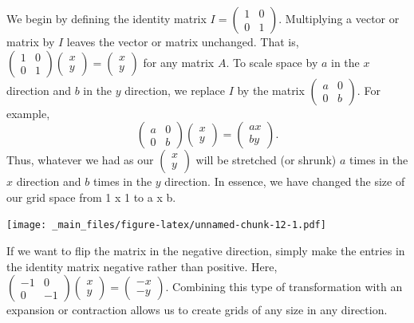 \documentclass[
]{book}
\theoremstyle{definition}
\theoremstyle{definition}
\theoremstyle{definition}
\theoremstyle{definition}
\theoremstyle{remark}
\begin{document}
We begin by defining the identity matrix \(I = \begin{pmatrix} 1 & 0 \\ 0 & 1 \end{pmatrix}\). Multiplying a vector or matrix by \(I\) leaves the vector or matrix unchanged. That is, \(\begin{pmatrix} 1 & 0 \\ 0 & 1 \end{pmatrix}\begin{pmatrix} x \\ y \end{pmatrix} = \begin{pmatrix} x \\ y \end{pmatrix}\) for any matrix \(A\). To scale space by \(a\) in the \(x\) direction and \(b\) in the \(y\) direction, we replace \(I\) by the matrix \(\begin{pmatrix} a & 0 \\ 0 & b \end{pmatrix}.\) For example, \[\begin{pmatrix} a & 0 \\ 0 & b \end{pmatrix}\begin{pmatrix} x \\ y \end{pmatrix} = \begin{pmatrix} ax \\ by \end{pmatrix}.\] Thus, whatever we had as our \(\begin{pmatrix} x \\ y \end{pmatrix}\) will be stretched (or shrunk) \(a\) times in the \(x\) direction and \(b\) times in the \(y\) direction. In essence, we have changed the size of our grid space from 1 x 1 to a x b.

\texttt{[image: \_main\_files/figure-latex/unnamed-chunk-12-1.pdf]}

If we want to flip the matrix in the negative direction, simply make the entries in the identity matrix negative rather than positive. Here, \(\begin{pmatrix} -1 & 0 \\ 0 & -1 \end{pmatrix}\begin{pmatrix} x \\ y \end{pmatrix} = \begin{pmatrix} -x \\ -y \end{pmatrix}\). Combining this type of transformation with an expansion or contraction allows us to create grids of any size in any direction.
\end{document}

